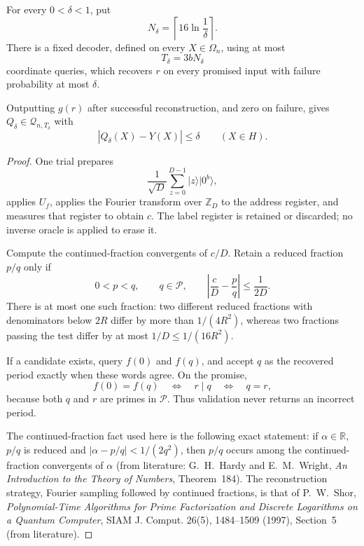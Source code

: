 \begin{lemma}\label{ian:period-hsp-fourier-reconstruction}
For every \(0<\delta<1\), put
\[
 N_\delta=\left\lceil16\ln\frac1\delta\right\rceil.
\]
There is a fixed decoder, defined on every \(X\in\Omega_n\), using at most
\[
 T_\delta=3bN_\delta
\]
coordinate queries, which recovers \(r\) on every promised input with failure probability at most \(\delta\).

Outputting \(g(\widehat r)\) after successful reconstruction, and zero on failure, gives
\(Q_\delta\in\mathcal Q_{n,T_\delta}\) with
\[
 |Q_\delta(X)-Y(X)|\le\delta\qquad(X\in H).
\]
\end{lemma}

\begin{proof}
One trial prepares
\[
 \frac1{\sqrt D}\sum_{z=0}^{D-1}|z\rangle|0^b\rangle,
\]
applies \(U_f\), applies the Fourier transform over \(\mathbb Z_D\) to the address register, and measures that register to obtain \(c\).
The label register is retained or discarded; no inverse oracle is applied to erase it.

Compute the continued-fraction convergents of \(c/D\). Retain a reduced fraction \(p/q\) only if
\[
 0<p<q,\qquad q\in\mathcal P,\qquad
 \left|\frac cD-\frac pq\right|\le\frac1{2D}.
\]
There is at most one such fraction: two different reduced fractions with denominators below \(2R\) differ by more than \(1/(4R^2)\), whereas two fractions passing the test differ by at most \(1/D\le1/(16R^2)\).

If a candidate exists, query \(f(0)\) and \(f(q)\), and accept \(q\) as the recovered period exactly when these words agree. On the promise,
\[
 f(0)=f(q)\quad\Longleftrightarrow\quad r\mid q
 \quad\Longleftrightarrow\quad q=r,
\]
because both \(q\) and \(r\) are primes in \(\mathcal P\).
Thus validation never returns an incorrect period.

The continued-fraction fact used here is the following exact statement: if
\(\alpha\in\mathbb R\), \(p/q\) is reduced and
\(|\alpha-p/q|<1/(2q^2)\), then \(p/q\) occurs among the continued-fraction convergents of \(\alpha\)
(from literature: G.~H.~Hardy and E.~M.~Wright,
\emph{An Introduction to the Theory of Numbers}, Theorem~184).
The reconstruction strategy, Fourier sampling followed by continued fractions, is that of P.~W.~Shor,
\emph{Polynomial-Time Algorithms for Prime Factorization and Discrete Logarithms on a Quantum Computer},
SIAM J. Comput. 26(5), 1484--1509 (1997), Section~5 (from literature).


\end{proof}
